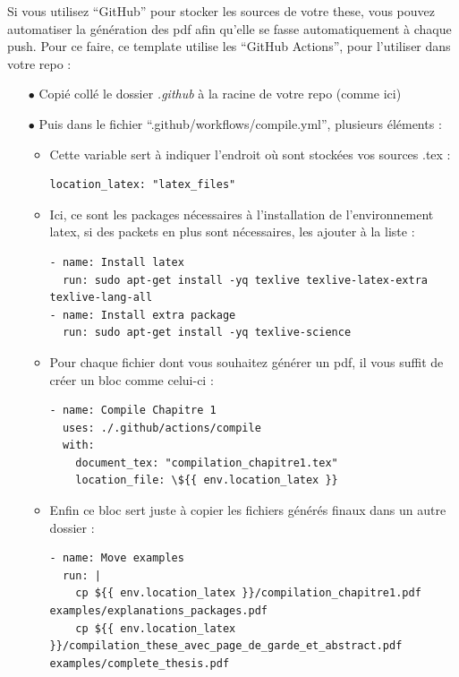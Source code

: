 \noindent Si vous utilisez ``GitHub'' pour stocker les sources de votre these, vous pouvez automatiser la génération des pdf afin qu'elle se fasse automatiquement à chaque push. Pour ce faire, ce template utilise les ``GitHub Actions'', pour l'utiliser dans votre repo :
\begin{itemize}
\item[$\bullet$] Copié collé le dossier \textit{.github} à la racine de votre repo (comme ici) 
\item[$\bullet$] Puis dans le fichier ``.github/workflows/compile.yml'', plusieurs éléments :
	\begin{itemize}
	\item Cette variable sert à indiquer l'endroit où sont stockées vos sources .tex :
\begin{lstlisting}
location_latex: "latex_files"
\end{lstlisting}
	\item Ici, ce sont les packages nécessaires à l'installation de l'environnement latex, si des packets en plus sont nécessaires, les ajouter à la liste :
\begin{lstlisting}
- name: Install latex
  run: sudo apt-get install -yq texlive texlive-latex-extra texlive-lang-all
- name: Install extra package
  run: sudo apt-get install -yq texlive-science
\end{lstlisting}
	\item Pour chaque fichier dont vous souhaitez générer un pdf, il vous suffit de créer un bloc comme celui-ci :
\begin{lstlisting}
- name: Compile Chapitre 1
  uses: ./.github/actions/compile
  with:
    document_tex: "compilation_chapitre1.tex"
    location_file: \${{ env.location_latex }}
\end{lstlisting}
	\item Enfin ce bloc sert juste à copier les fichiers générés finaux dans un autre dossier :
\begin{lstlisting}
- name: Move examples
  run: |
    cp ${{ env.location_latex }}/compilation_chapitre1.pdf examples/explanations_packages.pdf
    cp ${{ env.location_latex }}/compilation_these_avec_page_de_garde_et_abstract.pdf examples/complete_thesis.pdf
\end{lstlisting}
	\end{itemize}
\end{itemize}
